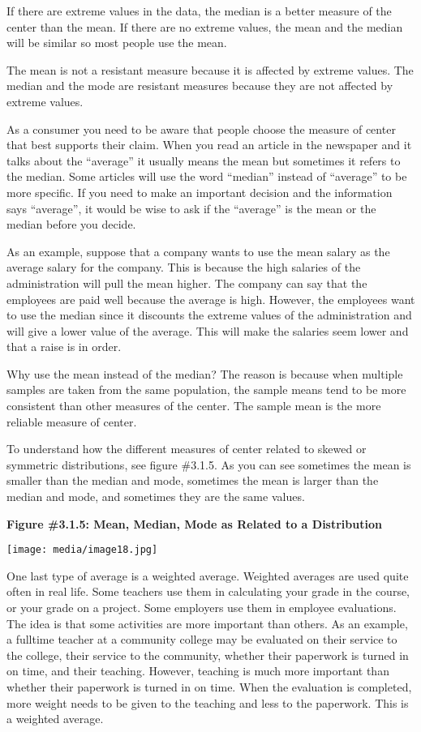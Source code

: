 \documentclass[]{book}
\begin{document}
If there are extreme values in the data, the median is a better measure
of the center than the mean. If there are no extreme values, the mean
and the median will be similar so most people use the mean.

The mean is not a resistant measure because it is affected by extreme
values. The median and the mode are resistant measures because they are
not affected by extreme values.

As a consumer you need to be aware that people choose the measure of
center that best supports their claim. When you read an article in the
newspaper and it talks about the ``average'' it usually means the mean but
sometimes it refers to the median. Some articles will use the word
``median'' instead of ``average'' to be more specific. If you need to make
an important decision and the information says ``average'', it would be
wise to ask if the ``average'' is the mean or the median before you
decide.

As an example, suppose that a company wants to use the mean salary as
the average salary for the company. This is because the high salaries of
the administration will pull the mean higher. The company can say that
the employees are paid well because the average is high. However, the
employees want to use the median since it discounts the extreme values
of the administration and will give a lower value of the average. This
will make the salaries seem lower and that a raise is in order.

Why use the mean instead of the median? The reason is because when
multiple samples are taken from the same population, the sample means
tend to be more consistent than other measures of the center. The sample
mean is the more reliable measure of center.

To understand how the different measures of center related to skewed or
symmetric distributions, see figure \#3.1.5. As you can see sometimes
the mean is smaller than the median and mode, sometimes the mean is
larger than the median and mode, and sometimes they are the same values.

\textbf{Figure \#3.1.5: Mean, Median, Mode as Related to a Distribution}

\texttt{[image: media/image18.jpg]}

One last type of average is a weighted average. Weighted averages are
used quite often in real life. Some teachers use them in calculating
your grade in the course, or your grade on a project. Some employers use
them in employee evaluations. The idea is that some activities are more
important than others. As an example, a fulltime teacher at a community
college may be evaluated on their service to the college, their service
to the community, whether their paperwork is turned in on time, and
their teaching. However, teaching is much more important than whether
their paperwork is turned in on time. When the evaluation is completed,
more weight needs to be given to the teaching and less to the paperwork.
This is a weighted average.
\end{document}
